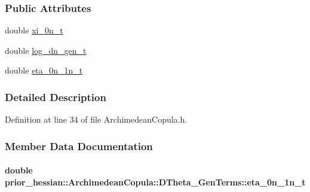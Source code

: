 \subsubsection*{Public Attributes}
\begin{DoxyCompactItemize}
\item 
double \hyperlink{structprior__hessian_1_1ArchimedeanCopula_1_1D2Theta__GenTerms_ae9b7323650d21aeb9d5ac91c4ae74fac}{xi\+\_\+0n\+\_\+t}
\item 
double \hyperlink{structprior__hessian_1_1ArchimedeanCopula_1_1DTheta__GenTerms_a53b2585e2895a634b563e6f7a27546db}{log\+\_\+dn\+\_\+gen\+\_\+t}
\item 
double \hyperlink{structprior__hessian_1_1ArchimedeanCopula_1_1DTheta__GenTerms_aad178f79e4a073efb684b19420a27644}{eta\+\_\+0n\+\_\+1n\+\_\+t}
\end{DoxyCompactItemize}


\subsubsection{Detailed Description}


Definition at line 34 of file Archimedean\+Copula.\+h.



\subsubsection{Member Data Documentation}
\paragraph[{\texorpdfstring{eta\+\_\+0n\+\_\+1n\+\_\+t}{eta_0n_1n_t}}]{\setlength{\rightskip}{0pt plus 5cm}double prior\+\_\+hessian\+::\+Archimedean\+Copula\+::\+D\+Theta\+\_\+\+Gen\+Terms\+::eta\+\_\+0n\+\_\+1n\+\_\+t\hspace{0.3cm}{\ttfamily [inherited]}}\hypertarget{structprior__hessian_1_1ArchimedeanCopula_1_1DTheta__GenTerms_aad178f79e4a073efb684b19420a27644}{}\label{structprior__hessian_1_1ArchimedeanCopula_1_1DTheta__GenTerms_aad178f79e4a073efb684b19420a27644}


